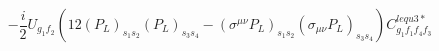 %
\begin{dmath*}
%
  -  \frac{i}{2}U_{g_1 f_2} \left(12 (P_L)_{s_1 s_2} (P_L)_{s_3 s_4} - (\sigma^{\mu\nu} P_L)_{s_1 s_2} (\sigma_{\mu\nu} P_L)_{s_3 s_4}\right) C^{lequ3*}_{g_1 f_1 f_4 f_3}
%
\end{dmath*}
%
